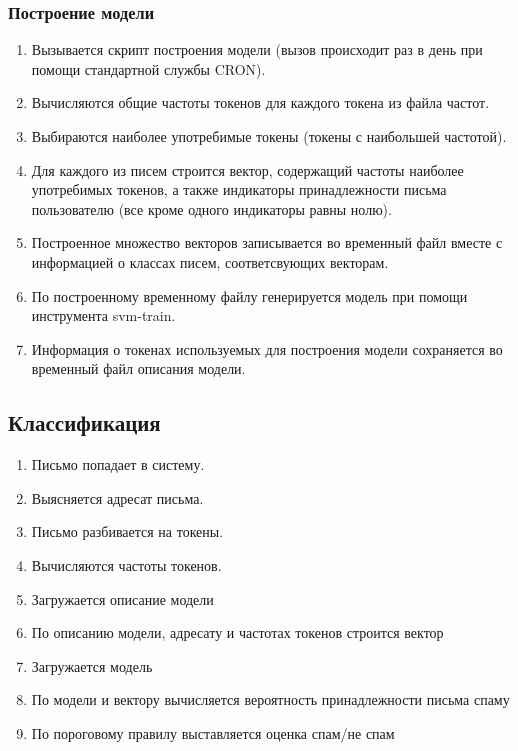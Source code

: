 \subsubsection{Построение модели}
\begin{enumerate}
    \item Вызывается скрипт построения модели (вызов происходит раз в день при помощи стандартной службы CRON).
    \item Вычисляются общие частоты токенов для каждого токена из файла частот.
    \item Выбираются наиболее употребимые токены (токены с наибольшей частотой).
    \item Для каждого из писем строится вектор, содержащий частоты наиболее употребимых токенов, а также индикаторы принадлежности письма пользователю (все кроме одного индикаторы равны нолю).
    \item Построенное множество векторов записывается во временный файл вместе с информацией о классах писем,  соответсвующих векторам.
    \item По построенному временному файлу генерируется модель при помощи инструмента svm-train.
    \item Информация о токенах используемых для построения модели сохраняется во временный файл описания модели.
\end{enumerate}

\subsection{Классификация}
\begin{enumerate}
    \item Письмо попадает в систему.
    \item Выясняется адресат письма.
    \item Письмо разбивается на токены.
    \item Вычисляются частоты токенов.
    \item Загружается описание модели
    \item По описанию модели, адресату и частотах токенов строится вектор
    \item Загружается модель
    \item По модели и вектору вычисляется вероятность принадлежности письма спаму
    \item По пороговому правилу выставляется оценка спам/не спам
\end{enumerate}

